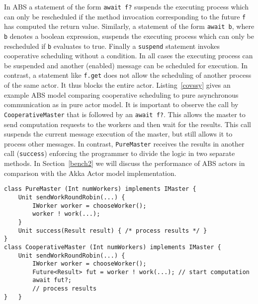 In ABS a statement of the form \texttt{await f?}
suspends the executing process which can only be rescheduled if the method
invocation corresponding to the future \texttt{f} has computed the return value.
Similarly, a statement of the form \texttt{await b}, where \texttt{b} denotes a boolean expression, suspends the executing process which can only be rescheduled if \texttt{b} evaluates to true. Finally a \texttt{suspend} statement invokes cooperative scheduling without a condition. In all cases the executing process can be suspended and another (enabled) message can be scheduled for execution.
In contrast, a statement like \texttt{f.get} does not allow the scheduling of
another process of the same actor. It thus blocks the entire actor. 
Listing~\ref{covssy} gives an example ABS model comparing cooperative scheduling to pure asynchronous communication as in pure actor model.
It is important to observe the call by \lstinline{CooperativeMaster} that is followed by an \texttt{await f?}. This allows the master to send computation requests to the workers and then wait for the results. This call suspends the current message execution of the master, but still allows it to process other messages. In contrast, \lstinline{PureMaster} receives the results in another call (\lstinline{success}) enforcing the programmer to divide the logic in two separate methods.
In Section~\ref{bench2} we will discuss the performance of ABS actors in comparison with the Akka Actor model implementation.


%
%

\begin{lstlisting}[caption=Cooperative scheduling vs. pure async approach, label=covssy]
class PureMaster (Int numWorkers) implements IMaster {
	Unit sendWorkRoundRobin(...) {
		IWorker worker = chooseWorker();
		worker ! work(...);
	}
	Unit success(Result result) { /* process results */ }
}
class CooperativeMaster (Int numWorkers) implements IMaster {
	Unit sendWorkRoundRobin(...) {
		IWorker worker = chooseWorker();
		Future<Result> fut = worker ! work(...); // start computation
		await fut?;
		// process results
}	}
\end{lstlisting}


